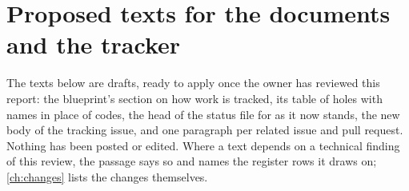 \chapter{Proposed texts for the documents and the tracker}\label{ch:tracker}

The texts below are drafts, ready to apply once the owner has reviewed this report: the
blueprint's section on how work is tracked, its table of holes with names in place of codes,
the head of the status file for  as it now stands, the new body of the tracking
issue, and one paragraph per related issue and pull request. Nothing has been posted or edited.
Where a text depends on a technical finding of this review, the passage says so and names the
register rows it draws on; \cref{ch:changes} lists the changes themselves.
